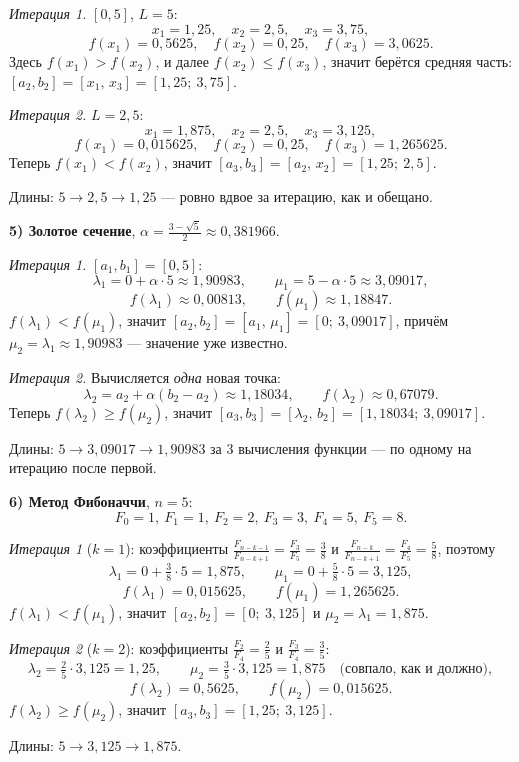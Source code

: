 \begin{example}
\emph{Итерация 1.} $[0,5]$, $L = 5$:
\[
  x_1 = 1{,}25 , \quad x_2 = 2{,}5 , \quad x_3 = 3{,}75 ,
\]
\[
  f(x_1) = 0{,}5625 , \quad f(x_2) = 0{,}25 , \quad f(x_3) = 3{,}0625 .
\]
Здесь $f(x_1) > f(x_2)$, и далее $f(x_2) \le f(x_3)$, значит берётся средняя
часть: $[a_2,b_2] = [x_1,\, x_3] = [1{,}25;\ 3{,}75]$.

\emph{Итерация 2.} $L = 2{,}5$:
\[
  x_1 = 1{,}875 , \quad x_2 = 2{,}5 , \quad x_3 = 3{,}125 ,
\]
\[
  f(x_1) = 0{,}015625 , \quad f(x_2) = 0{,}25 , \quad f(x_3) = 1{,}265625 .
\]
Теперь $f(x_1) < f(x_2)$, значит $[a_3,b_3] = [a_2,\, x_2] = [1{,}25;\ 2{,}5]$.

Длины: $5 \to 2{,}5 \to 1{,}25$ — ровно вдвое за итерацию, как и обещано.

\medskip
\noindent\textbf{5) Золотое сечение}, $\alpha = \frac{3-\sqrt5}{2} \approx 0{,}381966$.

\emph{Итерация 1.} $[a_1,b_1] = [0,5]$:
\[
  \lambda_1 = 0 + \alpha\cdot 5 \approx 1{,}90983 ,
  \qquad
  \mu_1 = 5 - \alpha\cdot 5 \approx 3{,}09017 ,
\]
\[
  f(\lambda_1) \approx 0{,}00813 , \qquad f(\mu_1) \approx 1{,}18847 .
\]
$f(\lambda_1) < f(\mu_1)$, значит $[a_2,b_2] = [a_1,\, \mu_1] = [0;\ 3{,}09017]$,
причём $\mu_2 = \lambda_1 \approx 1{,}90983$ — значение уже известно.

\emph{Итерация 2.} Вычисляется \emph{одна} новая точка:
\[
  \lambda_2 = a_2 + \alpha(b_2 - a_2) \approx 1{,}18034 ,
  \qquad f(\lambda_2) \approx 0{,}67079 .
\]
Теперь $f(\lambda_2) \ge f(\mu_2)$, значит
$[a_3,b_3] = [\lambda_2,\, b_2] = [1{,}18034;\ 3{,}09017]$.

Длины: $5 \to 3{,}09017 \to 1{,}90983$ за $3$ вычисления функции — по одному на
итерацию после первой.

\medskip
\noindent\textbf{6) Метод Фибоначчи}, $n = 5$:
\[
  F_0 = 1,\ F_1 = 1,\ F_2 = 2,\ F_3 = 3,\ F_4 = 5,\ F_5 = 8 .
\]

\emph{Итерация 1} ($k=1$): коэффициенты
$\frac{F_{n-k-1}}{F_{n-k+1}} = \frac{F_3}{F_5} = \frac38$ и
$\frac{F_{n-k}}{F_{n-k+1}} = \frac{F_4}{F_5} = \frac58$, поэтому
\[
  \lambda_1 = 0 + \tfrac38\cdot 5 = 1{,}875 ,
  \qquad
  \mu_1 = 0 + \tfrac58\cdot 5 = 3{,}125 ,
\]
\[
  f(\lambda_1) = 0{,}015625 , \qquad f(\mu_1) = 1{,}265625 .
\]
$f(\lambda_1) < f(\mu_1)$, значит $[a_2,b_2] = [0;\ 3{,}125]$ и
$\mu_2 = \lambda_1 = 1{,}875$.

\emph{Итерация 2} ($k=2$): коэффициенты $\frac{F_2}{F_4} = \frac25$ и
$\frac{F_3}{F_4} = \frac35$:
\[
  \lambda_2 = \tfrac25\cdot 3{,}125 = 1{,}25 ,
  \qquad
  \mu_2 = \tfrac35\cdot 3{,}125 = 1{,}875 \quad\text{(совпало, как и должно)} ,
\]
\[
  f(\lambda_2) = 0{,}5625 , \qquad f(\mu_2) = 0{,}015625 .
\]
$f(\lambda_2) \ge f(\mu_2)$, значит $[a_3,b_3] = [1{,}25;\ 3{,}125]$.

Длины: $5 \to 3{,}125 \to 1{,}875$.
\end{example}

